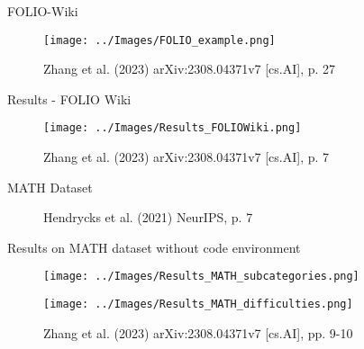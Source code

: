 \documentclass{beamer}
\begin{document}

\begin{frame}{FOLIO-Wiki}
    \begin{figure}
        \centering
        \texttt{[image: ../Images/FOLIO\_example.png]}

        \vspace{0.5em}
        {\tiny Zhang et al. (2023) arXiv:2308.04371v7 [cs.AI], p. 27}
    \end{figure}
\end{frame}

\begin{frame}{Results - FOLIO Wiki}
    \begin{figure}
        \centering
        \texttt{[image: ../Images/Results\_FOLIOWiki.png]}

        \vspace{0.5em}
        {\tiny Zhang et al. (2023) arXiv:2308.04371v7 [cs.AI], p. 7}
    \end{figure}
\end{frame}


\begin{frame}{MATH Dataset}
    \begin{figure}
        \centering
    \end{figure}
    \begin{figure}
        \centering

        \vspace{0.5em}
        {\tiny Hendrycks et al. (2021) NeurIPS, p. 7}
    \end{figure}
\end{frame}

\begin{frame}{Results on MATH dataset without code environment}
    \begin{figure}
        \centering
        \texttt{[image: ../Images/Results\_MATH\_subcategories.png]}
    \end{figure}
    \begin{figure}
        \centering
        \texttt{[image: ../Images/Results\_MATH\_difficulties.png]}

        \vspace{0.5em}
        {\tiny Zhang et al. (2023) arXiv:2308.04371v7 [cs.AI], pp. 9-10}
    \end{figure}
\end{frame}
\end{document}
